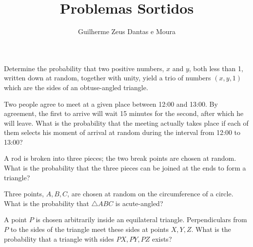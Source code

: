\documentclass[12pt,a4paper]{scrartcl}
\title{Problemas Sortidos}
\author{Guilherme Zeus Dantas e Moura}
\begin{document}
	
	\zeustitle


	\begin{prob}
		Determine the probability that two positive numbers, $x$ and $y$, both less than 1, written down at random, together with unity, yield a trio of numbers $(x, y, 1)$ which are the sides of an obtuse-angled triangle.
	\end{prob}

	\begin{prob}
		Two people agree to meet at a given place between 12:00 and 13:00.
		By agreement, the first to arrive will wait 15 minutes for the second, after which he will leave.
		What is the probability that the meeting actually takes place if each of them selects his moment of arrival at random during the interval from 12:00 to 13:00?
	\end{prob}

	\begin{prob}
		A rod is broken into three pieces; the two break points are chosen at random. What is the probability that the three pieces can be joined at the ends to form a triangle?
	\end{prob}

	\begin{prob}
		Three points, $A, B, C$, are chosen at random on the circumference of a circle. What is the probability that $\triangle A B C$ is acute-angled?
	\end{prob}

	\begin{prob}
		A point $P$ is chosen arbitrarily inside an equilateral triangle. Perpendiculars from $P$ to the sides of the triangle meet these sides at points $X, Y, Z$. What is the probability that a triangle with sides $P X, P Y, P Z$ exists?
	\end{prob}
\end{document}
